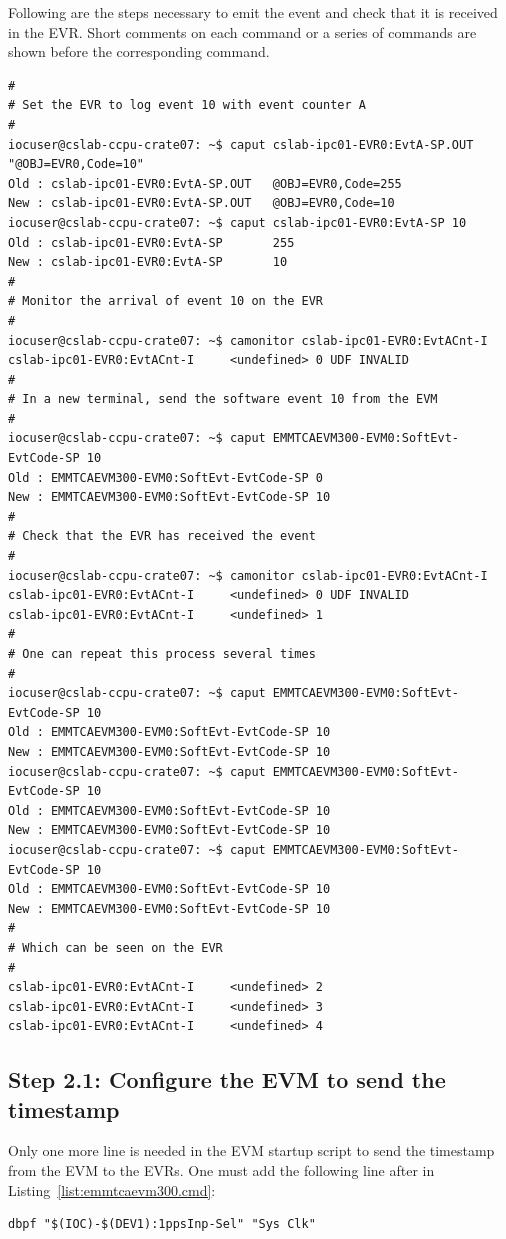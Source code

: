 \documentclass[11pt
  , a4paper
  , article
  , oneside
  , showtrims
]{memoir}
\begin{document}
Following are the steps necessary to emit the event and check that it is received in the EVR. Short comments on each command or a series of commands are shown before the corresponding command.

\begin{lstlisting}[style=termstyle]
#
# Set the EVR to log event 10 with event counter A
#
iocuser@cslab-ccpu-crate07: ~$ caput cslab-ipc01-EVR0:EvtA-SP.OUT "@OBJ=EVR0,Code=10"
Old : cslab-ipc01-EVR0:EvtA-SP.OUT   @OBJ=EVR0,Code=255
New : cslab-ipc01-EVR0:EvtA-SP.OUT   @OBJ=EVR0,Code=10
iocuser@cslab-ccpu-crate07: ~$ caput cslab-ipc01-EVR0:EvtA-SP 10
Old : cslab-ipc01-EVR0:EvtA-SP       255
New : cslab-ipc01-EVR0:EvtA-SP       10
#
# Monitor the arrival of event 10 on the EVR
#
iocuser@cslab-ccpu-crate07: ~$ camonitor cslab-ipc01-EVR0:EvtACnt-I
cslab-ipc01-EVR0:EvtACnt-I     <undefined> 0 UDF INVALID
#
# In a new terminal, send the software event 10 from the EVM
#
iocuser@cslab-ccpu-crate07: ~$ caput EMMTCAEVM300-EVM0:SoftEvt-EvtCode-SP 10
Old : EMMTCAEVM300-EVM0:SoftEvt-EvtCode-SP 0
New : EMMTCAEVM300-EVM0:SoftEvt-EvtCode-SP 10
#
# Check that the EVR has received the event
#
iocuser@cslab-ccpu-crate07: ~$ camonitor cslab-ipc01-EVR0:EvtACnt-I
cslab-ipc01-EVR0:EvtACnt-I     <undefined> 0 UDF INVALID
cslab-ipc01-EVR0:EvtACnt-I     <undefined> 1
#
# One can repeat this process several times
#
iocuser@cslab-ccpu-crate07: ~$ caput EMMTCAEVM300-EVM0:SoftEvt-EvtCode-SP 10
Old : EMMTCAEVM300-EVM0:SoftEvt-EvtCode-SP 10
New : EMMTCAEVM300-EVM0:SoftEvt-EvtCode-SP 10
iocuser@cslab-ccpu-crate07: ~$ caput EMMTCAEVM300-EVM0:SoftEvt-EvtCode-SP 10
Old : EMMTCAEVM300-EVM0:SoftEvt-EvtCode-SP 10
New : EMMTCAEVM300-EVM0:SoftEvt-EvtCode-SP 10
iocuser@cslab-ccpu-crate07: ~$ caput EMMTCAEVM300-EVM0:SoftEvt-EvtCode-SP 10
Old : EMMTCAEVM300-EVM0:SoftEvt-EvtCode-SP 10
New : EMMTCAEVM300-EVM0:SoftEvt-EvtCode-SP 10
#
# Which can be seen on the EVR
#
cslab-ipc01-EVR0:EvtACnt-I     <undefined> 2
cslab-ipc01-EVR0:EvtACnt-I     <undefined> 3
cslab-ipc01-EVR0:EvtACnt-I     <undefined> 4
\end{lstlisting}

\subsection{Step 2.1: Configure the EVM to send the timestamp}
Only one more line is needed in the EVM startup script to send the timestamp from the EVM to the EVRs. One must add the following line after  in Listing~\ref{list:emmtcaevm300.cmd}:
\begin{lstlisting}[style=termstyle]
dbpf "$(IOC)-$(DEV1):1ppsInp-Sel" "Sys Clk"
\end{lstlisting}
\end{document}
